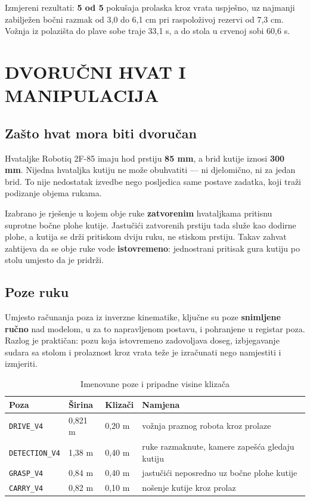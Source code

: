 \documentclass[12pt,a4paper]{article}
\begin{document}
Izmjereni rezultati: \textbf{5 od 5} pokušaja prolaska kroz vrata uspješno, uz najmanji zabilježen
bočni razmak od 3,0 do 6,1 cm pri raspoloživoj rezervi od 7,3 cm. Vožnja iz polazišta do plave
sobe traje 33,1 s, a do stola u crvenoj sobi 60,6 s.

\section{DVORUČNI HVAT I MANIPULACIJA}
\label{sec:hvat}

\subsection{Zašto hvat mora biti dvoručan}

Hvataljke Robotiq 2F-85 imaju hod prstiju \textbf{85 mm}, a brid kutije iznosi \textbf{300 mm}.
Nijedna hvataljka kutiju ne može obuhvatiti --- ni djelomično, ni za jedan brid. To nije
nedostatak izvedbe nego posljedica same postave zadatka, koji traži podizanje objema rukama.

Izabrano je rješenje u kojem obje ruke \textbf{zatvorenim} hvataljkama pritisnu suprotne bočne
plohe kutije. Jastučići zatvorenih prstiju tada služe kao dodirne plohe, a kutija se drži
pritiskom dviju ruku, ne stiskom prstiju. Takav zahvat zahtijeva da se obje ruke vode
\textbf{istovremeno}: jednostrani pritisak gura kutiju po stolu umjesto da je pridrži.

\subsection{Poze ruku}

Umjesto računanja poza iz inverzne kinematike, ključne su poze \textbf{snimljene ručno} nad
modelom, u za to napravljenom postavu, i pohranjene u registar poza. Razlog je praktičan: pozu
koja istovremeno zadovoljava doseg, izbjegavanje sudara sa stolom i prolaznost kroz vrata teže je
izračunati nego namjestiti i izmjeriti.

\begin{table}[!htbp]
    \centering
    \caption{Imenovane poze i pripadne visine klizača}
    \label{tab:poze}
    \scriptsize
    \begin{tabularx}{\textwidth}{@{}l l l X@{}}
        \toprule
        \textbf{Poza} & \textbf{Širina} & \textbf{Klizači} & \textbf{Namjena} \\
        \midrule
        \texttt{DRIVE\_V4}     & 0,821 m & 0,20 m & vožnja praznog robota kroz prolaze \\
        \texttt{DETECTION\_V4} & 1,38 m  & 0,40 m & ruke razmaknute, kamere zapešća gledaju kutiju \\
        \texttt{GRASP\_V4}     & 0,84 m  & 0,40 m & jastučići neposredno uz bočne plohe kutije \\
        \texttt{CARRY\_V4}     & 0,82 m  & 0,10 m & nošenje kutije kroz prolaz \\
        \bottomrule
    \end{tabularx}
\end{table}
\end{document}
